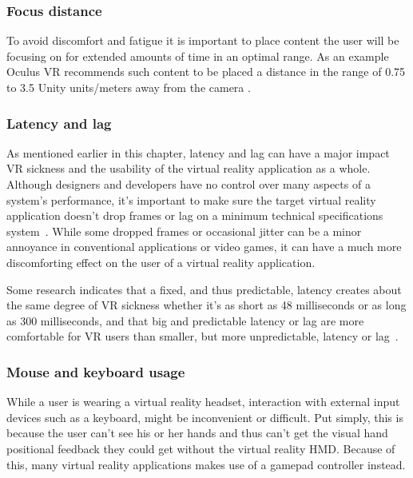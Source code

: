 \subsubsection{Focus distance}
To avoid discomfort and fatigue it is important to place content the user will be focusing on for extended amounts of time in an optimal range.
As an example Oculus VR recommends such content to be placed a distance in the range of 0.75 to 3.5 Unity units/meters away from the camera \citep{OCULUS2016}. 

\subsubsection{Latency and lag}
As mentioned earlier in this chapter, latency and lag can have a major impact VR sickness and the usability of the virtual reality application as a whole.
Although designers and developers have no control over many aspects of a system's performance, it's important to make sure the target virtual reality application
doesn't drop frames or lag on a minimum technical specifications system~\citep{OCULUS2016}. While some dropped frames or occasional jitter can be a minor annoyance
in conventional applications or video games, it can have a much more discomforting effect on the user of a virtual reality application. 

Some research indicates that a fixed, and thus predictable, latency creates about the same degree of VR sickness whether it's as short as 48 milliseconds or as long 
as 300 milliseconds, and that big and predictable latency or lag are more comfortable for VR users than smaller, but more unpredictable, latency or lag~\citep{Draper2001}. 

\subsubsection{Mouse and keyboard usage}
While a user is wearing a virtual reality headset, interaction with external input devices such as a keyboard, might be inconvenient or difficult. 
Put simply, this is because the user can't see his or her hands and thus can't get the visual hand positional feedback they could get without the virtual reality HMD. 
Because of this, many virtual reality applications makes use of a gamepad controller instead. %







